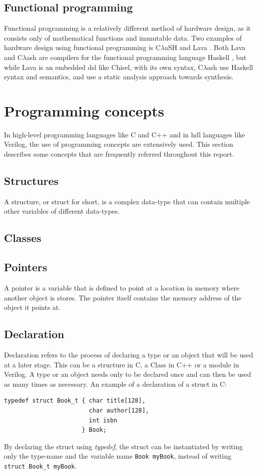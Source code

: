 \subsection{Functional programming}
Functional programming is a relatively different method of hardware design, as it consists only of mathematical functions and immutable data. Two examples of hardware design using functional programming is C$\lambda$aSH \cite{baaij2009clash} and Lava \cite{bjesse1998lava}. Both Lava and C$\lambda$ash are compilers for the functional programming language Haskell \cite{haskellonline}, but while Lava is an embedded \gls{dsl} like Chisel, with its own syntax, C$\lambda$ash use Haskell syntax and semantics, and use a static analysis approach towards synthesis.

\section{Programming concepts}
In high-level programming languages like C and C++ and in \gls{hdl} languages like Verilog, the use of programming concepts are extensively used. This section describes some concepts that are frequently referred throughout this report.
\subsection{Structures}
A structure, or struct for short, is a complex data-type that can contain multiple other variables of different data-types. 
\subsection{Classes}

\subsection{Pointers}
A pointer is a variable that is defined to point at a location in memory where another object is stores. The pointer itself contains the memory address of the object it points at.
\subsection{Declaration}
Declaration refers to the process of declaring a type or an object that will be used at a later stage. This can be a structure in C, a Class in C++ or a module in Verilog. A type or an object needs only to be declared once and can then be used as many times as necessary. An example of a declaration of a struct in C: 
\lstset{language=C++, style=Cstyle}
\begin{lstlisting}
typedef struct Book_t { char title[128], 
                        char author[128], 
                        int isbn 
                      } Book;
\end{lstlisting}
By declaring the struct using \textit{typedef}, the struct can be instantiated by writing only the type-name and the variable name \verb!Book myBook!, instead of writing \verb!struct Book_t myBook!.

